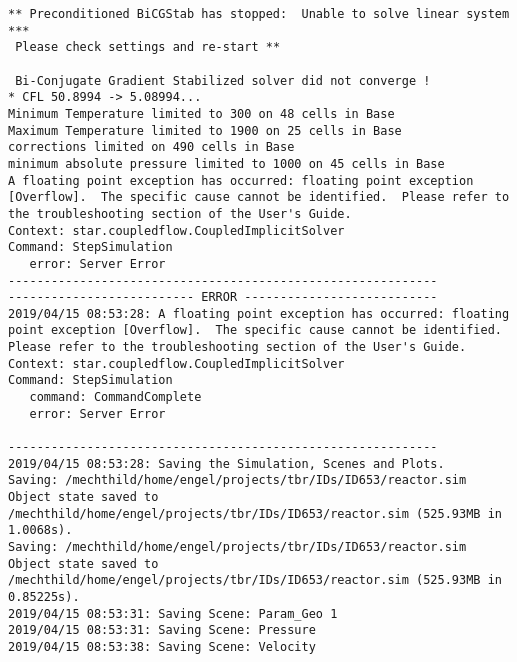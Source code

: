 \documentclass{article}
\begin{document}
{\begin{verbatim}
** Preconditioned BiCGStab has stopped:  Unable to solve linear system *** 
 Please check settings and re-start ** 

 Bi-Conjugate Gradient Stabilized solver did not converge !
* CFL 50.8994 -> 5.08994...
Minimum Temperature limited to 300 on 48 cells in Base
Maximum Temperature limited to 1900 on 25 cells in Base
corrections limited on 490 cells in Base
minimum absolute pressure limited to 1000 on 45 cells in Base
A floating point exception has occurred: floating point exception [Overflow].  The specific cause cannot be identified.  Please refer to the troubleshooting section of the User's Guide.
Context: star.coupledflow.CoupledImplicitSolver
Command: StepSimulation
   error: Server Error
------------------------------------------------------------
-------------------------- ERROR ---------------------------
2019/04/15 08:53:28: A floating point exception has occurred: floating point exception [Overflow].  The specific cause cannot be identified.  Please refer to the troubleshooting section of the User's Guide.
Context: star.coupledflow.CoupledImplicitSolver
Command: StepSimulation
   command: CommandComplete
   error: Server Error

------------------------------------------------------------
2019/04/15 08:53:28: Saving the Simulation, Scenes and Plots.
Saving: /mechthild/home/engel/projects/tbr/IDs/ID653/reactor.sim
Object state saved to /mechthild/home/engel/projects/tbr/IDs/ID653/reactor.sim (525.93MB in 1.0068s).
Saving: /mechthild/home/engel/projects/tbr/IDs/ID653/reactor.sim
Object state saved to /mechthild/home/engel/projects/tbr/IDs/ID653/reactor.sim (525.93MB in 0.85225s).
2019/04/15 08:53:31: Saving Scene: Param_Geo 1
2019/04/15 08:53:31: Saving Scene: Pressure
2019/04/15 08:53:38: Saving Scene: Velocity
\end{verbatim}
}
\clearpage
\end{document}
